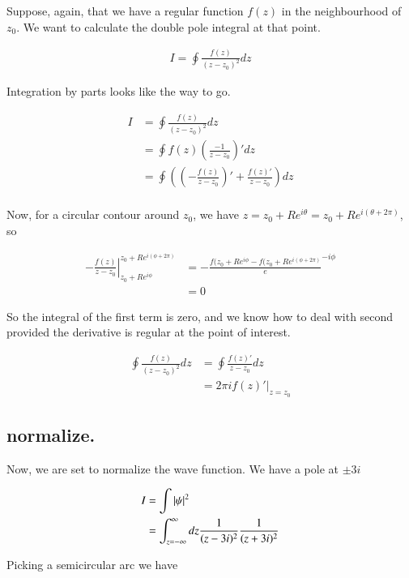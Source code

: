 \documentclass{article}
\begin{document}
Suppose, again, that we have a regular function $f(z)$ in the neighbourhood
of $z_0$.  We want to calculate the double pole integral at that point.

\begin{align*}
I = \oint \frac{f(z)}{(z-z_0)^2} dz
\end{align*}

Integration by parts looks like the way to go.

\begin{align*}
I 
&= \oint \frac{f(z)}{(z-z_0)^2} dz \\
&= \oint {f(z)}\left(\frac{-1}{z-z_0}\right)' dz \\
&= \oint \left( \left(-\frac{f(z)}{z-z_0}\right)' +\frac{{f(z)}'}{z-z_0} \right) dz \\
\end{align*}

Now, for a circular contour around $z_0$, we have
$z = z_0 + R e^{i\theta} = z_0 + R e^{i(\theta+2\pi)}$, so 

\begin{align*}
{\left.-\frac{f(z)}{z-z_0}\right\vert}_{z_0 + R e^{i\phi}}^{z_0 + R e^{i(\phi + 2\pi)}} 
&= -\frac{f(z_0 + R e^{i\phi} - f(z_0 + R e^{i(\phi + 2\pi)}} e^{-i\phi} \\
&= 0
\end{align*}

So the integral of the first term is zero, and we know how to deal with second provided the derivative is regular at the point of interest.  

\begin{align*}
\oint \frac{f(z)}{(z-z_0)^2} dz
&= \oint \frac{{f(z)}'}{z-z_0} dz \\
&= 2 \pi i {\left.f(z)'\right\vert}_{z=z_0}
\end{align*}

\subsection{ normalize. }

Now, we are set to normalize the wave function.  We have a pole at $\pm 3i$

\begin{align*}
I 
&= \int \left\lvert{\psi}\right\rvert^2  \\
&= \int_{z=-\infty}^{\infty} dz \frac{1}{(z - 3i)^2} \frac{1}{(z + 3i)^2} \\
\end{align*}

Picking a semicircular arc we have
\end{document}
